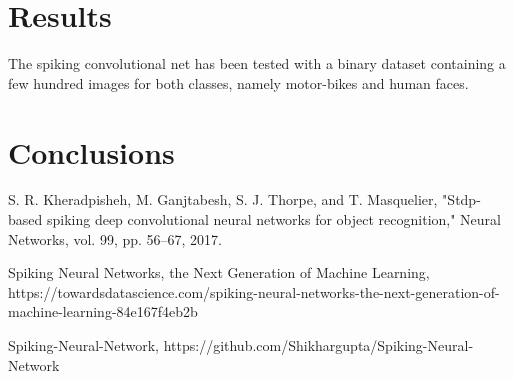 \documentclass[11pt,a4paper]{scrartcl}
\begin{document}
\section{Results}
The spiking convolutional net has been tested with a binary dataset containing a few hundred images for both classes, namely motor-bikes and human faces.



\section{Conclusions}

\clearpage

\begin{thebibliography}{5}

S. R. Kheradpisheh, M. Ganjtabesh, S. J. Thorpe, and
T. Masquelier, "Stdp-based spiking deep convolutional neural
networks for object recognition," Neural Networks, vol. 99,
pp. 56–67, 2017.

Spiking Neural Networks, the Next Generation of Machine Learning, https://towardsdatascience.com/spiking-neural-networks-the-next-generation-of-machine-learning-84e167f4eb2b

Spiking-Neural-Network, https://github.com/Shikhargupta/Spiking-Neural-Network
\end{thebibliography}
\end{document}
